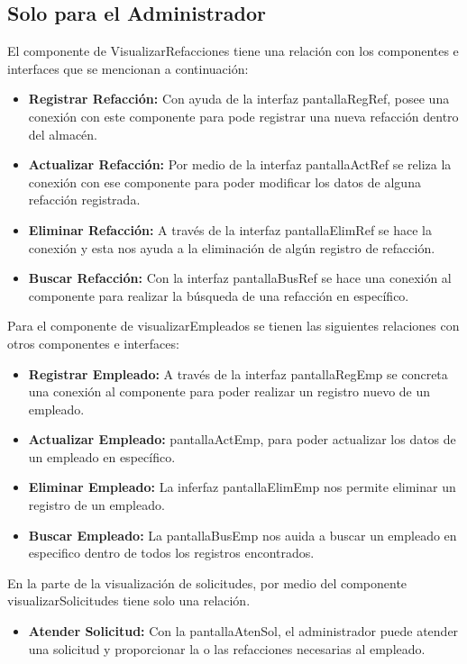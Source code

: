 \subsection{Solo para el Administrador}
El componente de VisualizarRefacciones tiene una relación con los componentes e interfaces que se mencionan a continuación:
\begin{itemize}
	\item \textbf{Registrar Refacción: } Con ayuda de la interfaz pantallaRegRef, posee una conexión con este componente para pode registrar una nueva refacción dentro del almacén.
	\item \textbf{Actualizar Refacción: } Por medio de la interfaz pantallaActRef se reliza la conexión con ese componente para poder modificar los datos de alguna refacción registrada.
	\item \textbf{Eliminar Refacción: } A través de la interfaz pantallaElimRef se hace la conexión y esta nos ayuda a la eliminación de algún registro de refacción.
	\item \textbf{Buscar Refacción: } Con la interfaz pantallaBusRef se hace una conexión al componente para realizar la búsqueda de una refacción en específico.
\end{itemize}
Para el componente de visualizarEmpleados se tienen las siguientes relaciones con otros componentes e interfaces:
\begin{itemize}
	\item \textbf{Registrar Empleado: } A través de la interfaz pantallaRegEmp se concreta una conexión al componente para poder realizar un registro nuevo de un empleado.
	\item \textbf{Actualizar Empleado: } pantallaActEmp, para poder actualizar los datos de un empleado en específico.
	\item \textbf{Eliminar Empleado: } La inferfaz pantallaElimEmp nos permite eliminar un registro de un empleado.
	\item \textbf{Buscar Empleado: } La pantallaBusEmp nos auida a buscar un empleado en especifico dentro de todos los registros encontrados.
\end{itemize}
En la parte de la visualización de solicitudes, por medio del componente visualizarSolicitudes tiene solo una relación.
\begin{itemize}
	\item \textbf{Atender Solicitud: } Con la pantallaAtenSol, el administrador puede atender una solicitud y proporcionar la o las refacciones necesarias al empleado.
\end{itemize}

